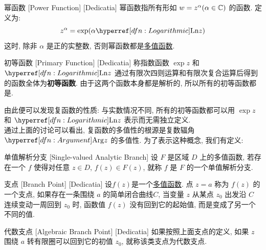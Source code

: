         \begin{dfn}
            {幂函数}
            [Power Function]
            [Dedicatia]
            幂函数指所有形如 \(w=z^\alpha (\alpha\in\operatorname{\mathbb{C}})\) 的函数. 定义为: 
            \[z^\alpha = \exp(\alpha \Ln z)\]
            这时, 除非 \(\alpha\) 是正的实整数, 否则幂函数都是\hyperref[dfn:Multivalued]{多值函数}. 
        \end{dfn}

        \begin{dfn}
            {初等函数}
            [Primary Function]
            [Dedicatia]
            称指数函数 \(\exp z\) 和 \(\Ln z\) 通过有限次四则运算和有限次复合运算后得到的函数全体为\textbf{初等函数}. 由于这两个函数本身都是解析的, 所以所有的初等函数都是\Analytic{}. 
        \end{dfn}

        由此便可以发现复函数的性质: 与实数情况不同, 所有的初等函数都可以用 \(\exp z\) 和 \(\Ln z\) 表示而无需独立定义. \\
        通过上面的讨论可以看出, 复函数的多值性的根源是复数辐角 \(\Arg z\) 的多值性. 为了表示这种概念, 我们有定义: 

        \begin{dfn}
            {单值解析分支}
            [Single-valued Analytic Branch]
            设 \(F\) 是区域 \(D\) 上的多值函数, 若存在一个\Analytic{}  \(f\) 使得对任意 \(z\in D\),  \(f(z)\in F(z)\), 就称 \(f\) 是 \(F\) 的一个单值解析分支. 
        \end{dfn}

        \begin{dfn}
            {支点}
            [Branch Point]
            [Dedicatia]
            设\(f(z)\)是一个\hyperref[dfn:Multivalued]{多值函数}. 点 \(z = a\) 称为 \(f(z)\) 的一个支点, 如果存在一条围绕 \(a\) 的简单闭合曲线\(C\), 当变量 \(z\) 从某点 \(z_0\) 出发沿 \(C\) 连续变动一周回到 \(z_0\) 时, 函数值 \(f(z)\) 没有回到它的起始值, 而是变成了另一个不同的值. 
        \end{dfn}

        \begin{dfn}
            {代数支点}
            [Algebraic Branch Point]
            [Dedicatia]
            如果按照上面支点的定义, 如果 \(z\) 围绕 \(a\) 转有限圈可以回到它的初值 \(z_0\), 就称该类支点为代数支点. 
        \end{dfn}

